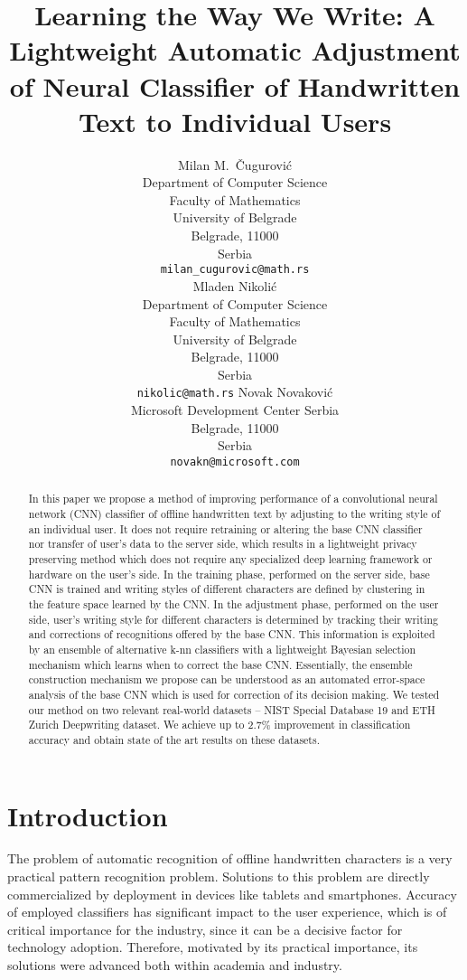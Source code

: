 \documentclass{article}
\title{Learning the Way We Write: A Lightweight Automatic Adjustment of %
Neural Classifier of Handwritten Text to Individual Users}
\author{%
  Milan M.~Čugurović\\
  Department of Computer Science\\
  Faculty of Mathematics\\
  University of Belgrade\\
  Belgrade, 11000\\
  Serbia\\
  \texttt{milan\_cugurovic@math.rs} \\
  \And
  Mladen Nikolić\\
  Department of Computer Science\\
  Faculty of Mathematics\\
  University of Belgrade\\
  Belgrade, 11000\\
  Serbia\\
  \texttt{nikolic@math.rs}
  \And
  Novak Novaković \\
  Microsoft Development Center Serbia\\
  Belgrade, 11000\\
  Serbia\\
  \texttt{novakn@microsoft.com}
}
\begin{document}
\maketitle

\begin{abstract}
  In this paper we propose a method of improving performance of a convolutional neural network (CNN) classifier of offline handwritten text by adjusting to the writing 
  style of an individual user. It does not require retraining or altering the base CNN classifier nor transfer of user's data to the server side, which results in 
  a lightweight privacy preserving method which does not require any specialized deep learning framework or hardware on the user's side. In the training phase, 
  performed on the server side, base CNN is trained and writing styles of different characters are defined by clustering in the feature space learned by the CNN. 
  In the adjustment phase, performed on the user side, user's writing style for different characters is determined by tracking their writing and corrections of 
  recognitions offered by the base CNN. This information is exploited by an ensemble of alternative k-nn classifiers with a lightweight Bayesian selection mechanism 
  which learns when to correct the base CNN. Essentially, the ensemble construction mechanism we propose can be understood as an automated error-space analysis of 
  the base CNN which is used for correction of its decision making.
  We tested our method on two relevant real-world datasets -- NIST Special Database 19 and ETH Zurich Deepwriting dataset. 
  We achieve up to 2.7\% improvement in classification accuracy and obtain state of the art results on these datasets.
\end{abstract}

\section{Introduction}
The problem of automatic recognition of offline handwritten characters is a very practical pattern recognition problem. Solutions to this problem are directly commercialized  by deployment in devices like tablets and smartphones. 
Accuracy of employed classifiers has significant impact to the user experience, which is of critical importance for the industry, since it can be a decisive factor for technology adoption. 
Therefore, motivated by its practical importance, its solutions were advanced both within academia and industry. 
\end{document}
